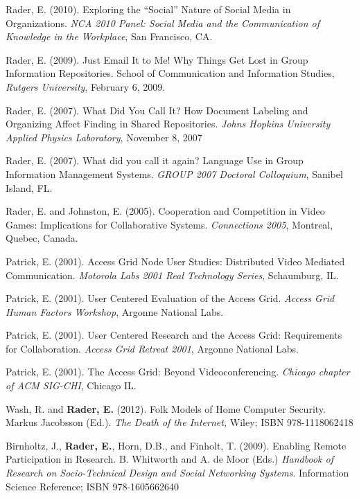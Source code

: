 \documentclass[9pt]{extarticle}
\makeatletter
\renewcommand{\section}{%
  \@startsection{section}{1}{0em}{\baselineskip}{3pt}{\large\bfseries\textsc}}
\makeatother
\begin{document}
Rader, E. (2010). Exploring the ``Social'' Nature of Social Media in Organizations. \emph{NCA 2010 Panel: Social Media and the Communication of Knowledge in the Workplace}, San Francisco, CA.

Rader, E. (2009). Just Email It to Me! Why Things Get Lost in Group Information Repositories. School of Communication and Information Studies, \emph{Rutgers University}, February 6, 2009.

Rader, E. (2007). What Did You Call It? How Document Labeling and Organizing Affect Finding in Shared Repositories. \emph{Johns Hopkins University Applied Physics Laboratory}, November 8, 2007

Rader, E. (2007). What did you call it again? Language Use in Group Information Management Systems. \emph{GROUP 2007 Doctoral Colloquium}, Sanibel Island, FL.

Rader, E. and Johnston, E. (2005). Cooperation and Competition in Video Games: Implications for Collaborative Systems. \emph{Connections 2005}, Montreal, Quebec, Canada.

Patrick, E. (2001). Access Grid Node User Studies: Distributed Video Mediated Communication. \emph{Motorola Labs 2001 Real Technology Series}, Schaumburg, IL.

Patrick, E. (2001). User Centered Evaluation of the Access Grid. \emph{Access Grid Human Factors Workshop}, Argonne National Labs.

Patrick, E. (2001). User Centered Research and the Access Grid: Requirements for Collaboration. \emph{Access Grid Retreat 2001}, Argonne National Labs.

Patrick, E. (2001). The Access Grid: Beyond Videoconferencing. \emph{Chicago chapter of ACM SIG-CHI}, Chicago IL.


\section{Book Chapters}

Wash, R. and \textbf{Rader, E.} (2012). Folk Models of Home Computer Security. Markus Jacobsson (Ed.). \emph{The Death of the Internet,} Wiley; ISBN 978-1118062418

Birnholtz, J., \textbf{Rader, E.}, Horn, D.B., and Finholt, T. (2009). Enabling Remote Participation in Research. B. Whitworth and A. de Moor (Eds.) \emph{Handbook of Research on Socio-Technical Design and Social Networking Systems}. Information Science Reference; ISBN 978-1605662640
\end{document}
